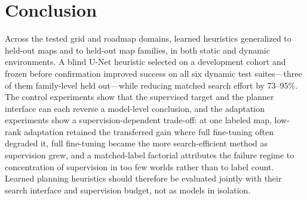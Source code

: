\documentclass[letterpaper]{article} %
\begin{document}
\section{Conclusion}

Across the tested grid and roadmap domains, learned heuristics generalized to held-out maps and to held-out map families, in both static and dynamic environments. A blind U-Net heuristic selected on a development cohort and frozen before confirmation improved success on all six dynamic test suites---three of them family-level held out---while reducing matched search effort by 73--95\%. The control experiments show that the supervised target and the planner interface can each reverse a model-level conclusion, and the adaptation experiments show a supervision-dependent trade-off: at one labeled map, low-rank adaptation retained the transferred gain where full fine-tuning often degraded it, full fine-tuning became the more search-efficient method as supervision grew, and a matched-label factorial attributes the failure regime to concentration of supervision in too few worlds rather than to label count. Learned planning heuristics should therefore be evaluated jointly with their search interface and supervision budget, not as models in isolation.



\end{document}
